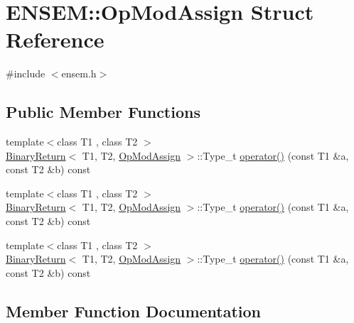 \hypertarget{structENSEM_1_1OpModAssign}{}\section{E\+N\+S\+EM\+:\+:Op\+Mod\+Assign Struct Reference}
\label{structENSEM_1_1OpModAssign}


{\ttfamily \#include $<$ensem.\+h$>$}

\subsection*{Public Member Functions}
\begin{DoxyCompactItemize}
\item 
{\footnotesize template$<$class T1 , class T2 $>$ }\\\mbox{\hyperlink{structENSEM_1_1BinaryReturn}{Binary\+Return}}$<$ T1, T2, \mbox{\hyperlink{structENSEM_1_1OpModAssign}{Op\+Mod\+Assign}} $>$\+::Type\+\_\+t \mbox{\hyperlink{structENSEM_1_1OpModAssign_a3d9009924395ef97f9d281e378953c06}{operator()}} (const T1 \&a, const T2 \&b) const
\item 
{\footnotesize template$<$class T1 , class T2 $>$ }\\\mbox{\hyperlink{structENSEM_1_1BinaryReturn}{Binary\+Return}}$<$ T1, T2, \mbox{\hyperlink{structENSEM_1_1OpModAssign}{Op\+Mod\+Assign}} $>$\+::Type\+\_\+t \mbox{\hyperlink{structENSEM_1_1OpModAssign_a3d9009924395ef97f9d281e378953c06}{operator()}} (const T1 \&a, const T2 \&b) const
\item 
{\footnotesize template$<$class T1 , class T2 $>$ }\\\mbox{\hyperlink{structENSEM_1_1BinaryReturn}{Binary\+Return}}$<$ T1, T2, \mbox{\hyperlink{structENSEM_1_1OpModAssign}{Op\+Mod\+Assign}} $>$\+::Type\+\_\+t \mbox{\hyperlink{structENSEM_1_1OpModAssign_a3d9009924395ef97f9d281e378953c06}{operator()}} (const T1 \&a, const T2 \&b) const
\end{DoxyCompactItemize}


\subsection{Member Function Documentation}
\mbox{\label{structENSEM_1_1OpModAssign_a3d9009924395ef97f9d281e378953c06}} 
